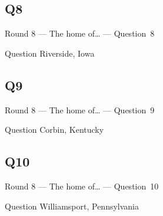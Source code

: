 \documentclass[11pt]{beamer}
\begin{document}
\subsection*{Q8}
\begin{frame}[t]{Round 8 --- The home of\ldots{} --- \mbox{Question 8}}
    \vspace{-0.5em}
    \begin{block}{Question}
        Riverside, Iowa
    \end{block}
\end{frame}
\subsection*{Q9}
\begin{frame}[t]{Round 8 --- The home of\ldots{} --- \mbox{Question 9}}
    \vspace{-0.5em}
    \begin{block}{Question}
        Corbin, Kentucky
    \end{block}
\end{frame}
\subsection*{Q10}
\begin{frame}[t]{Round 8 --- The home of\ldots{} --- \mbox{Question 10}}
    \vspace{-0.5em}
    \begin{block}{Question}
        Williamsport, Pennsylvania
    \end{block}
\end{frame}
\end{document}
